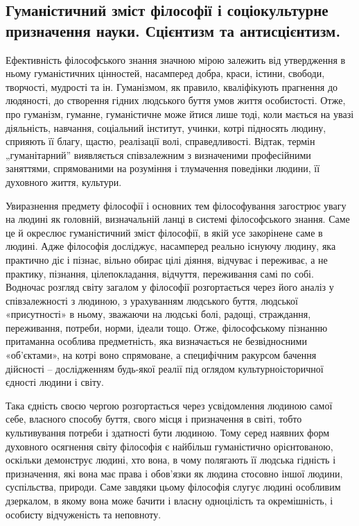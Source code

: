 \subsection[Гуманістичний зміст філософії і призначення науки.]{Гуманістичний зміст філософії і соціокультурне призначення науки. Сцієнтизм та антисцієнтизм.} 
Ефективність філософського знання значною
мірою залежить від утвердження в ньому гуманістичних цінностей, насамперед
добра, краси, істини, свободи, творчості, мудрості та ін. Гуманізмом, як 
правило, кваліфікують прагнення до людяності, до створення гідних людського
буття умов життя особистості. Отже, про гуманізм, гуманне, гуманістичне може
йтися лише тоді, коли мається на увазі діяльність, навчання, соціальний
інститут, учинки, котрі підносять людину, сприяють її благу, щастю, реалізації
волі, справедливості. Відтак, термін „гуманітарний” виявляється співзалежним
з визначеними професійними заняттями, спрямованими на розуміння і
тлумачення поведінки людини, її духовного життя, культури.

Увиразнення предмету філософії і основних тем філософування загострює
увагу на людині як головній, визначальній ланці в системі філософського
знання. Саме це й окреслює гуманістичний зміст філософії, в якій усе
закорінене саме в людині. Адже філософія досліджує, насамперед реально
існуючу людину, яка практично діє і пізнає, вільно обирає цілі діяння, відчуває
і переживає, а не практику, пізнання, цілепокладання, відчуття, переживання
самі по собі. Водночас розгляд світу загалом у філософії розгортається через
його аналіз у співзалежності з людиною, з урахуванням людського буття,
людської «присутності» в ньому, зважаючи на людські болі, радощі,
страждання, переживання, потреби, норми, ідеали тощо. Отже, філософському
пізнанню притаманна особлива предметність, яка визначається не
безвідносними «об’єктами», на котрі воно спрямоване, а специфічним ракурсом
бачення дійсності – дослідженням будь-якої реалії під оглядом культурноісторичної єдності людини і світу.

Така єдність своєю чергою розгортається через усвідомлення людиною
самої себе, власного способу буття, свого місця і призначення в світі, тобто
культивування потреби і здатності бути людиною. Тому серед наявних форм
духовного осягнення світу філософія є найбільш гуманістично орієнтованою,
оскільки демонструє людині, хто вона, в чому полягають її людська гідність і
призначення, які вона має права і обов’язки як людина стосовно іншої людини,
суспільства, природи. Саме завдяки цьому філософія слугує людині особливим
дзеркалом, в якому вона може бачити і власну одноцілість та окремішність, і
особисту відчуженість та неповноту.

